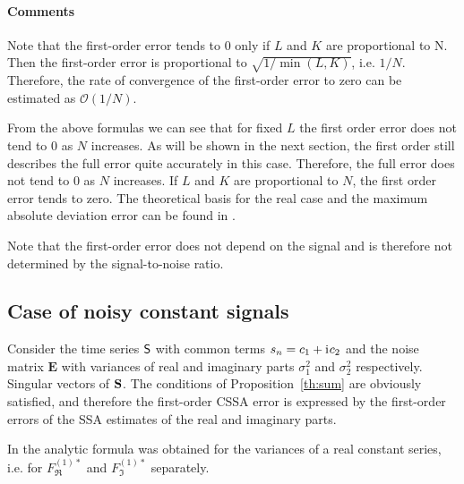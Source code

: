 \documentclass[engproc, submit, article,pdftex,moreauthors]{Definitions/mdpi}
\newcommand{\iu}{\mathrm{i}\mkern1mu}
\begin{document}
\paragraph{Comments}
Note that the first-order error tends to $0$ only if $L$ and $K$ are proportional to N. Then the first-order error is proportional to $\sqrt{1/\min(L,K)}$, i.e. $1/N$. Therefore, the rate of convergence of the first-order error to zero can be estimated as $\mathcal{O}(1/N)$.

\begin{Remark}
From the above formulas we can see that for fixed $L$ the first order error does not tend to $0$ as $N$ increases. As will be shown in the next section, the first order still describes the full error quite accurately in this case. Therefore, the full error does not tend to $0$ as $N$ increases. If $L$ and $K$ are proportional to $N$, the first order error tends to zero.
The theoretical basis for the real case and the maximum absolute deviation error can be found in \cite{Nekrutkin2024}.
\end{Remark}

Note that the first-order error does not depend on the signal and is therefore not determined by the signal-to-noise ratio.

\subsection{Case of noisy constant signals}
\label{sec:noise}

Consider the time series $\textsf{S}$ with common terms $s_n = c_1 + \iu c_2$ and the noise matrix $\mathbf{E}$ with variances of real and imaginary parts $\sigma_1^2$ and $\sigma_2^2$ respectively.
Singular vectors of $\mathbf{S}$.
The conditions of Proposition~\ref{th:sum} are obviously satisfied, and therefore the first-order CSSA error is expressed by the first-order errors of the SSA estimates of the real and imaginary parts.

In \cite{Golyandina.Vlassieva2009} the analytic formula was obtained for the variances of a real constant series, i.e. for $F^{(1)*}_{\Re}$ and $F^{(1)*}_{\Im}$ separately.
\end{document}
